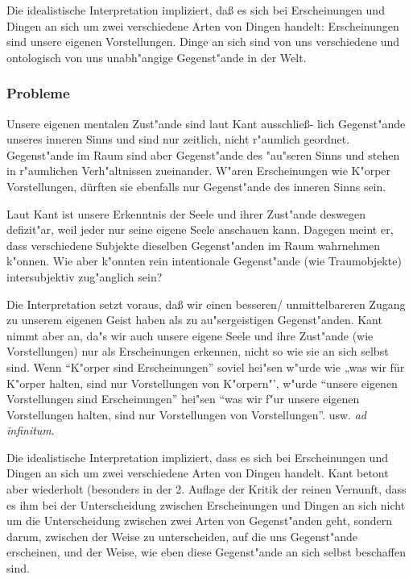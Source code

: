 \documentclass[emulatestandardclasses]{scrartcl}
\begin{document}
Die idealistische Interpretation impliziert, daß es sich bei Erscheinungen und Dingen an sich um zwei verschiedene Arten von Dingen handelt: Erscheinungen sind unsere eigenen Vorstellungen. Dinge an sich sind von uns verschiedene und ontologisch von uns unabh"angige Gegenst"ande in der Welt.

\subsubsection{Probleme}

\begin{description}[leftmargin=!,labelwidth=\widthof{\bfseries M}]
  \item[Innerer und "Au"serer Sinn] Unsere eigenen mentalen Zust"ande sind laut Kant ausschließ- lich Gegenst"ande unseres inneren Sinns und sind nur zeitlich, nicht r"aumlich geordnet. Gegenst"ande im Raum sind aber Gegenst"ande des "au"seren Sinns und stehen in r"aumlichen Verh"altnissen zueinander. W"aren Erscheinungen wie K"orper Vorstellungen, dürften sie ebenfalls nur Gegenst"ande des inneren Sinns sein.
  \item[Fehlende Intersubjektivit"at] Laut Kant ist unsere Erkenntnis der Seele und ihrer Zust"ande deswegen defizit"ar, weil jeder nur seine eigene Seele anschauen kann. Dagegen meint er, dass verschiedene Subjekte dieselben Gegenst"anden im Raum wahrnehmen k"onnen. Wie aber k"onnten rein intentionale Gegenst"ande (wie Traumobjekte) intersubjektiv zug"anglich sein?
  \item[Kants Anticartesianismus] Die Interpretation setzt voraus, daß wir einen besseren/ unmittelbareren Zugang zu unserem eigenen Geist haben als zu au"sergeistigen Gegenst"anden. Kant nimmt aber an, da"s wir auch unsere eigene Seele und ihre Zust"ande (wie Vorstellungen) nur als Erscheinungen erkennen, nicht so wie sie an sich selbst sind. Wenn "`K"orper sind Erscheinungen"' soviel hei"sen w"urde wie „was wir für K"orper halten, sind nur Vorstellungen von K"orpern"', w"urde "`unsere eigenen Vorstellungen sind Erscheinungen"' hei"sen "`was wir f"ur unsere eigenen Vorstellungen halten, sind nur Vorstellungen von Vorstellungen"'. usw. \emph{ad infinitum}.
  \item[Die Identit"at von Erscheinungen und D.a.s.] Die idealistische Interpretation impliziert, dass es sich bei Erscheinungen und Dingen an sich um zwei verschiedene Arten von Dingen handelt. Kant betont aber wiederholt (besonders in der 2. Auflage der Kritik der reinen Vernunft, dass es ihm bei der Unterscheidung zwischen Erscheinungen und Dingen an sich nicht um die Unterscheidung zwischen zwei Arten von Gegenst"anden geht, sondern darum, zwischen der Weise zu unterscheiden, auf die uns Gegenst"ande erscheinen, und der Weise, wie eben diese Gegenst"ande an sich selbst beschaffen sind.
\end{description}
\end{document}
